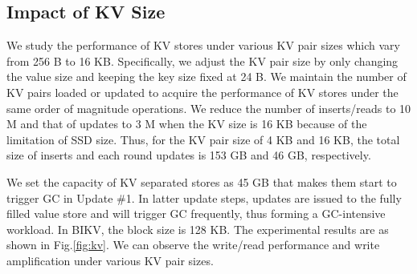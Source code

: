 \documentclass[sigconf]{acmart}
\begin{document}
\subsection{Impact of KV Size}
We study the performance of KV stores under various KV pair sizes which vary from 256 B to 16 KB. Specifically, we adjust the KV pair size by only changing the value size and keeping the key size fixed at 24 B. We maintain the number of KV pairs loaded or updated to acquire the performance of KV stores under the same order of magnitude operations. We reduce the number of inserts/reads to 10 M and that of updates to 3 M when the KV size is 16 KB because of the limitation of SSD size. Thus, for the KV pair size of 4 KB and 16 KB, the total size of inserts and each round updates is 153 GB and 46 GB, respectively.

We set the capacity of KV separated stores as 45 GB that makes them start to trigger GC in Update \#1. In latter update steps, updates are issued to the fully filled value store and will trigger GC frequently, thus forming a GC-intensive workload. In BIKV, the block size is 128 KB. The experimental results are as shown in Fig.\ref{fig:kv}. We can observe the write/read performance and write amplification under various KV pair sizes. 

\end{document}

